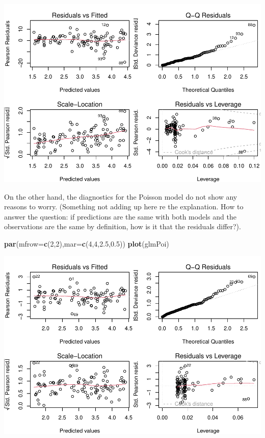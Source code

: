 \documentclass[
]{book}
\newenvironment{Shaded}{\begin{snugshade}}{\end{snugshade}}
\newcommand{\AttributeTok}[1]{\textcolor[rgb]{0.13,0.29,0.53}{#1}}
\newcommand{\DecValTok}[1]{\textcolor[rgb]{0.00,0.00,0.81}{#1}}
\newcommand{\FloatTok}[1]{\textcolor[rgb]{0.00,0.00,0.81}{#1}}
\newcommand{\FunctionTok}[1]{\textcolor[rgb]{0.13,0.29,0.53}{\textbf{#1}}}
\newcommand{\NormalTok}[1]{#1}
\begin{document}
\includegraphics{ECOMODbook_files/figure-latex/glm6-1.pdf}

On the other hand, the diagnostics for the Poisson model do not show any reasons to worry. (Something not adding up here re the explanation. How to answer the question: if predictions are the same with both models and the observations are the same by definition, how is it that the residuals differ?).

\begin{Shaded}
\begin{Highlighting}[]
\FunctionTok{par}\NormalTok{(}\AttributeTok{mfrow=}\FunctionTok{c}\NormalTok{(}\DecValTok{2}\NormalTok{,}\DecValTok{2}\NormalTok{),}\AttributeTok{mar=}\FunctionTok{c}\NormalTok{(}\DecValTok{4}\NormalTok{,}\DecValTok{4}\NormalTok{,}\FloatTok{2.5}\NormalTok{,}\FloatTok{0.5}\NormalTok{))}
\FunctionTok{plot}\NormalTok{(glmPoi)}
\end{Highlighting}
\end{Shaded}

\includegraphics{ECOMODbook_files/figure-latex/glm7-1.pdf}
\end{document}

